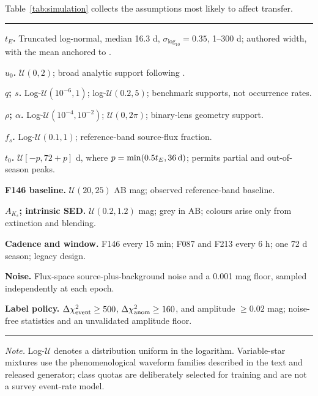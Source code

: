\documentclass[twocolumn,linenumbers,floatfix,twocolappendix]{aastex701}
\begin{document}
Table~\ref{tab:simulation} collects the assumptions most likely to affect transfer.

\begin{table}[tbp]
\centering
\caption{Core simulation and labelling assumptions for the released model.\label{tab:simulation}}
\small
\hrule
\vspace{4pt}
\begin{minipage}[t]{0.47\textwidth}
\textbf{$t_E$.} Truncated log-normal, median 16.3 d,
$\sigma_{\log_{10}}=0.35$, 1--300 d; authored width, with the mean anchored to
\citet{Mroz2019}.\par\smallskip
\textbf{$u_0$.} $\mathcal{U}(0,2)$; broad analytic support following
\citet{Zhang2021}.\par\smallskip
\textbf{$q$; $s$.} Log-$\mathcal{U}(10^{-6},1)$; log-$\mathcal{U}(0.2,5)$;
benchmark supports, not occurrence rates.\par\smallskip
\textbf{$\rho$; $\alpha$.} Log-$\mathcal{U}(10^{-4},10^{-2})$;
$\mathcal{U}(0,2\pi)$; binary-lens geometry support.\par\smallskip
\textbf{$f_s$.} Log-$\mathcal{U}(0.1,1)$; reference-band source-flux
fraction.\par\smallskip
\textbf{$t_0$.} $\mathcal{U}[-p,72+p]$ d, where
$p=\min(0.5t_E,36\,{\rm d})$; permits partial and out-of-season peaks.
\end{minipage}\hfill
\begin{minipage}[t]{0.47\textwidth}
\textbf{F146 baseline.} $\mathcal{U}(20,25)$ AB mag; observed reference-band
baseline.\par\smallskip
\textbf{$A_{K_s}$; intrinsic SED.} $\mathcal{U}(0.2,1.2)$ mag; grey in AB;
colours arise only from extinction and blending.\par\smallskip
\textbf{Cadence and window.} F146 every 15 min; F087 and F213 every 6 h; one
72 d season; legacy design.\par\smallskip
\textbf{Noise.} Flux-space source-plus-background noise and a 0.001 mag floor,
sampled independently at each epoch.\par\smallskip
\textbf{Label policy.} $\Delta\chi^2_{\rm event}\geq500$,
$\Delta\chi^2_{\rm anom}\geq160$, and amplitude $\geq0.02$ mag; noise-free
statistics and an unvalidated amplitude floor.
\end{minipage}
\vspace{4pt}
\hrule
\vspace{3pt}

\parbox{0.94\textwidth}{\footnotesize \textit{Note.} Log-$\mathcal{U}$ denotes a distribution
uniform in the logarithm. Variable-star mixtures use the phenomenological waveform families
described in the text and released generator; class quotas are deliberately selected for training
and are not a survey event-rate model.}
\end{table}
\end{document}
